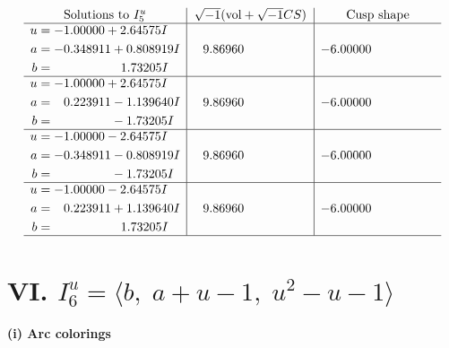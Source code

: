 \documentclass[1p]{elsarticle_modified}
\theoremstyle{definition}
\newcommand{\I}{\sqrt{-1}}
\begin{document}
$$\begin{array}{c|c|c}  
\text{Solutions to }I^u_{5}& \I (\text{vol} + \sqrt{-1}CS) & \text{Cusp shape}\\
 \hline 
\begin{aligned}
u &= -1.00000 + 2.64575 I \\
a &= -0.348911 + 0.808919 I \\
b &= \phantom{-0.000000 -}1.73205 I\end{aligned}
 & \phantom{-}9.86960\phantom{ +0.000000I} & -6.00000\phantom{ +0.000000I} \\ \hline\begin{aligned}
u &= -1.00000 + 2.64575 I \\
a &= \phantom{-}0.223911 - 1.139640 I \\
b &= \phantom{-0.000000 } -1.73205 I\end{aligned}
 & \phantom{-}9.86960\phantom{ +0.000000I} & -6.00000\phantom{ +0.000000I} \\ \hline\begin{aligned}
u &= -1.00000 - 2.64575 I \\
a &= -0.348911 - 0.808919 I \\
b &= \phantom{-0.000000 } -1.73205 I\end{aligned}
 & \phantom{-}9.86960\phantom{ +0.000000I} & -6.00000\phantom{ +0.000000I} \\ \hline\begin{aligned}
u &= -1.00000 - 2.64575 I \\
a &= \phantom{-}0.223911 + 1.139640 I \\
b &= \phantom{-0.000000 -}1.73205 I\end{aligned}
 & \phantom{-}9.86960\phantom{ +0.000000I} & -6.00000\phantom{ +0.000000I}\\
 \hline 
 \end{array}$$\newpage\newpage\renewcommand{\arraystretch}{1}
\centering \section*{VI. $I^u_{6}= \langle b,\;a+u-1,\;u^2- u-1 \rangle$}
\flushleft \textbf{(i) Arc colorings}\\
\end{document}
